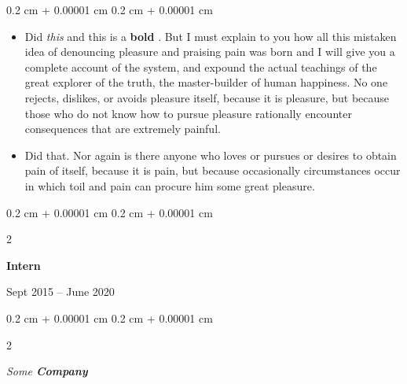 \documentclass[10pt, letterpaper]{article}
\newenvironment{highlights}{
    \begin{itemize}[
        topsep=0.10 cm,
        parsep=0.10 cm,
        partopsep=0pt,
        itemsep=0pt,
        leftmargin=0.4 cm + 10pt
    ]
}{
    \end{itemize}
} %
\newenvironment{onecolentry}{
    \begin{adjustwidth}{
        0.2 cm + 0.00001 cm
    }{
        0.2 cm + 0.00001 cm
    }
}{
    \end{adjustwidth}
} %
\newenvironment{twocolentry}[2][]{
    \onecolentry
    \def\secondColumn{#2}
    \setcolumnwidth{\fill, 4.5 cm}
    \begin{paracol}{2}
}{
    \switchcolumn \raggedleft \secondColumn
    \end{paracol}
    \endonecolentry
} %
\let\hrefWithoutArrow\href
\renewcommand{\href}[2]{\hrefWithoutArrow{#1}{\ifthenelse{\equal{#2}{}}{ }{#2 }\raisebox{.15ex}{\footnotesize \faExternalLink*}}}
\begin{document}
        \vspace{0.10 cm}
        \begin{onecolentry}
            \begin{highlights}
                \item Did \textit{this} and this is a \textbf{bold} \href{https://example.com}{link}. But I must explain to you how all this mistaken idea of denouncing pleasure and praising pain was born and I will give you a complete account of the system, and expound the actual teachings of the great explorer of the truth, the master-builder of human happiness. No one rejects, dislikes, or avoids pleasure itself, because it is pleasure, but because those who do not know how to pursue pleasure rationally encounter consequences that are extremely painful.
                \item Did that. Nor again is there anyone who loves or pursues or desires to obtain pain of itself, because it is pain, but because occasionally circumstances occur in which toil and pain can procure him some great pleasure.
            \end{highlights}
        \end{onecolentry}


        \vspace{0.2 cm}

                \begin{twocolentry}{
                    Sept 2015 – June 2020
                }
                \textbf{Intern}
                \end{twocolentry}
            \begin{twocolentry}{
            }
            \textit{Some \textbf{Company}}
            \end{twocolentry}
\end{document}

